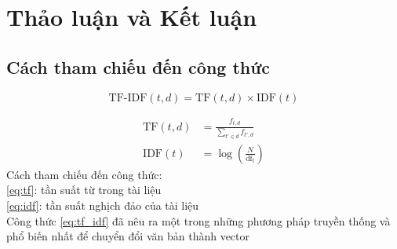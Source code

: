 \chapter{\textbf{Thảo luận và Kết luận}}

\section{Cách tham chiếu đến công thức}

\begin{equation}
    \text{TF-IDF}(t, d) = \text{TF}(t, d) \times \text{IDF}(t)
    \label{eq:tf_idf}
\end{equation}

\begin{align}
\mathrm{TF}(t, d) &= \frac{f_{t,d}}{\sum\limits_{t' \in d} f_{t',d}} \tag{1} \label{eq:tf} \\
\mathrm{IDF}(t) &= \log \left( \frac{N}{\mathrm{df}_t} \right) \label{eq:idf} \tag{2}
\end{align}
Cách tham chiếu đến công thức: \\
\eqref{eq:tf}: tần suất từ trong tài liệu \\
\eqref{eq:idf}: tần suất nghịch đảo của tài liệu \\

Công thức \eqref{eq:tf_idf} đã nêu ra một trong những phương pháp truyền thống và phổ biến nhất để chuyển đổi văn bản thành vector